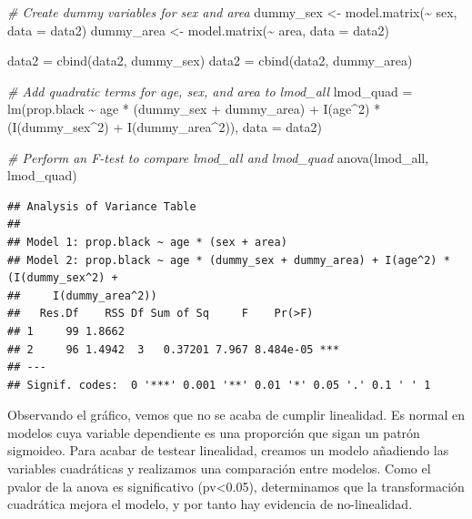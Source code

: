 \documentclass[
]{article}
\newenvironment{Shaded}{\begin{snugshade}}{\end{snugshade}}
\newcommand{\AttributeTok}[1]{\textcolor[rgb]{0.77,0.63,0.00}{#1}}
\newcommand{\CommentTok}[1]{\textcolor[rgb]{0.56,0.35,0.01}{\textit{#1}}}
\newcommand{\DecValTok}[1]{\textcolor[rgb]{0.00,0.00,0.81}{#1}}
\newcommand{\FunctionTok}[1]{\textcolor[rgb]{0.00,0.00,0.00}{#1}}
\newcommand{\NormalTok}[1]{#1}
\newcommand{\OtherTok}[1]{\textcolor[rgb]{0.56,0.35,0.01}{#1}}
\newcommand{\SpecialCharTok}[1]{\textcolor[rgb]{0.00,0.00,0.00}{#1}}
\begin{document}
\begin{Shaded}
\begin{Highlighting}[]
\CommentTok{\# Create dummy variables for sex and area}
\NormalTok{dummy\_sex }\OtherTok{\textless{}{-}} \FunctionTok{model.matrix}\NormalTok{(}\SpecialCharTok{\textasciitilde{}}\NormalTok{ sex, }\AttributeTok{data =}\NormalTok{ data2)}
\NormalTok{dummy\_area }\OtherTok{\textless{}{-}} \FunctionTok{model.matrix}\NormalTok{(}\SpecialCharTok{\textasciitilde{}}\NormalTok{ area, }\AttributeTok{data =}\NormalTok{ data2)}

\NormalTok{data2 }\OtherTok{=} \FunctionTok{cbind}\NormalTok{(data2, dummy\_sex)}
\NormalTok{data2 }\OtherTok{=} \FunctionTok{cbind}\NormalTok{(data2, dummy\_area)}

\CommentTok{\# Add quadratic terms for age, sex, and area to lmod\_all}
\NormalTok{lmod\_quad }\OtherTok{=} \FunctionTok{lm}\NormalTok{(prop.black }\SpecialCharTok{\textasciitilde{}}\NormalTok{ age }\SpecialCharTok{*}\NormalTok{ (dummy\_sex }\SpecialCharTok{+}\NormalTok{ dummy\_area) }\SpecialCharTok{+} \FunctionTok{I}\NormalTok{(age}\SpecialCharTok{\^{}}\DecValTok{2}\NormalTok{) }\SpecialCharTok{*}\NormalTok{ (}\FunctionTok{I}\NormalTok{(dummy\_sex}\SpecialCharTok{\^{}}\DecValTok{2}\NormalTok{) }\SpecialCharTok{+} \FunctionTok{I}\NormalTok{(dummy\_area}\SpecialCharTok{\^{}}\DecValTok{2}\NormalTok{)), }\AttributeTok{data =}\NormalTok{ data2)}

\CommentTok{\# Perform an F{-}test to compare lmod\_all and lmod\_quad}
\FunctionTok{anova}\NormalTok{(lmod\_all, lmod\_quad)}
\end{Highlighting}
\end{Shaded}

\begin{verbatim}
## Analysis of Variance Table
## 
## Model 1: prop.black ~ age * (sex + area)
## Model 2: prop.black ~ age * (dummy_sex + dummy_area) + I(age^2) * (I(dummy_sex^2) + 
##     I(dummy_area^2))
##   Res.Df    RSS Df Sum of Sq     F    Pr(>F)    
## 1     99 1.8662                                 
## 2     96 1.4942  3   0.37201 7.967 8.484e-05 ***
## ---
## Signif. codes:  0 '***' 0.001 '**' 0.01 '*' 0.05 '.' 0.1 ' ' 1
\end{verbatim}

Observando el gráfico, vemos que no se acaba de cumplir linealidad. Es
normal en modelos cuya variable dependiente es una proporción que sigan
un patrón sigmoideo. Para acabar de testear linealidad, creamos un
modelo añadiendo las variables cuadráticas y realizamos una comparación
entre modelos. Como el pvalor de la anova es significativo
(pv\textless0.05), determinamos que la transformación cuadrática mejora
el modelo, y por tanto hay evidencia de no-linealidad.
\end{document}
